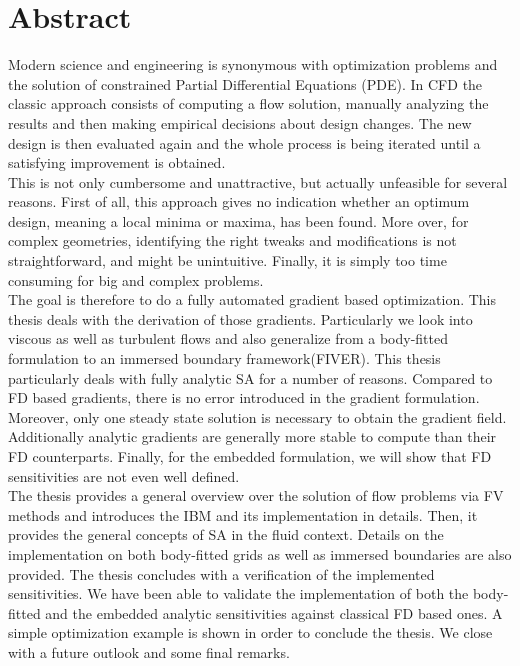 \section*{Abstract}
Modern science and engineering is synonymous with optimization problems and the solution of constrained Partial Differential Equations (PDE).
In \acf{CFD} the classic approach consists of computing a flow solution, manually analyzing the results and then making empirical decisions about design changes. The new design is then evaluated again and the whole process is being iterated until a satisfying improvement is obtained.\\
This is not only cumbersome and unattractive, but actually unfeasible for several reasons. First of all, this approach gives no indication whether an optimum design, meaning a local minima or maxima, has been found. More over, for complex geometries, identifying the right tweaks and modifications is not straightforward, and might be unintuitive. Finally, it is simply too time consuming for big and complex problems.\\
The goal is therefore to do a fully automated gradient based optimization. This thesis deals with the derivation of those gradients. Particularly we look into viscous as well as turbulent flows and also generalize from a body-fitted formulation to an immersed boundary framework(FIVER). This thesis particularly deals with fully analytic \acf{SA} for a number of reasons. Compared to \acf{FD} based gradients, there is no error introduced in the gradient formulation. Moreover, only one steady state solution is necessary to obtain the gradient field. Additionally analytic gradients are generally more stable to compute than their \acf{FD} counterparts. Finally, for the embedded formulation, we will show that \ac{FD} sensitivities are not even well defined.\\
The thesis provides a general overview over the solution of flow problems via \ac{FV} methods and introduces the \acf{IBM} and its implementation in details. Then, it provides the general concepts of \ac{SA} in the fluid context. Details on the implementation on both body-fitted grids as well as immersed boundaries are also provided.  The thesis concludes with a verification of the implemented sensitivities. We have been able to validate the implementation of both the body-fitted and the embedded analytic sensitivities against classical \ac{FD} based ones. A simple optimization example is shown in order to conclude the thesis. We close with a future outlook and some final remarks.


